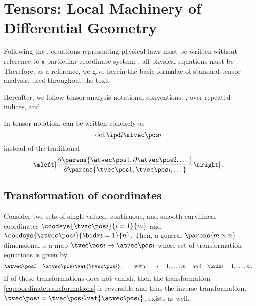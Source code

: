 
\section{Tensors: Local Machinery of Differential Geometry}

Following the , equations representing physical laws must be written without reference to a particular coordinate system; \ie, all physical equations must be . Therefore, as a reference, we give herein the basic formulae of standard tensor analysis, used throughout the text. 

Hereafter, we follow tensor analysis notational conventions: ,  over repeated indices, and . 

\begin{example}
  In tensor notation,  can be written concisely as
  \begin{equation}\label{eq:jacobiandeterminant}
    \det\ipd i\atvec\pos i
  \end{equation}
  instead of the traditional
  \begin{equation*}
    \mleft\lvert
      \dfrac{\partial\parens{\atvec\pos 1, \partial\atvec\pos 2, \dotsc}}{\partial\parens{\tvec\pos 1, \tvec\pos i, \dotsc}}
    \mright\rvert \,.
  \end{equation*}
\end{example}


\subsection{Transformation of coordinates}

\begin{definition}
  Consider two sets of single-valued, continuous, and smooth curvilinear coordinates $\coodsys{\tvec\pos i}{i = 1}{m}$ and $\coodsys{\atvec\pos i}{\bidx i = 1}{n}$. Then, a general $\parens{m\times n}$-dimensional  is a map $\tvec\pos i\mapsto\atvec\pos i$ whose set of transformation equations is given by
  \begin{equation}\label{eq:coordinatetransformations}
    \atvec\pos i = \atvec\pos i\vat{\tvec\pos i} \,,\qquad\text{with}\qquad
    i = 1, \dotsc, m                             \, \quad\text{and}\quad
    \bidx i = 1, \dotsc, n                       \,.
  \end{equation}
  If  of these transformations does not vanish, then the transformation \cref{eq:coordinatetransformations} is reversible and thus the inverse transformation, $\tvec\pos i = \tvec\pos i\vat{\atvec\pos i}$, exists as well.
\end{definition}

